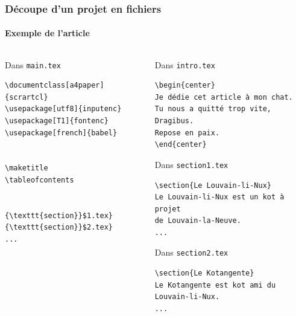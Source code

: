 \begin{frame}[fragile]
  \frametitle{Découpe d'un projet en fichiers}
  \framesubtitle{Exemple de l'article}
  \begin{columns}
      \begin{column}{0.5\textwidth}
          Dans \texttt{main.tex}
          \begin{lstlisting}[style=nonumbers, mathescape]
\documentclass[a4paper]{scrartcl}
\usepackage[utf8]{inputenc}
\usepackage[T1]{fontenc}
\usepackage[french]{babel}


\maketitle
\tableofcontents


{\texttt{section}}$1.tex}
{\texttt{section}}$2.tex}
...

          \end{lstlisting}
      \end{column}
      \begin{column}{0.5\textwidth}
          Dans \texttt{intro.tex}
          \begin{lstlisting}[style=nonumbers]
\begin{center}
Je dédie cet article à mon chat.
Tu nous a quitté trop vite, Dragibus.
Repose en paix.
\end{center}
          \end{lstlisting}

          Dans \texttt{section1.tex}
          \begin{lstlisting}[style=nonumbers]
\section{Le Louvain-li-Nux}
Le Louvain-li-Nux est un kot à projet
de Louvain-la-Neuve.
...
          \end{lstlisting}

          Dans \texttt{section2.tex}
          \begin{lstlisting}[style=nonumbers]
\section{Le Kotangente}
Le Kotangente est kot ami du
Louvain-li-Nux.
...
          \end{lstlisting}
      \end{column}
  \end{columns}
\end{frame}
